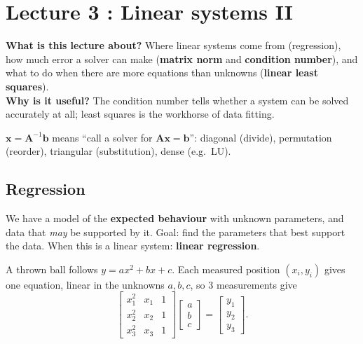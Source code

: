 \documentclass[11pt,a4paper,openany]{book}
\begin{document}
\chapter{Lecture 3 : Linear systems II}

\begin{rembox}[title=In a nutshell]
\textbf{What is this lecture about?} Where linear systems come from (regression), how much error
a solver can make (\textbf{matrix norm} and \textbf{condition number}), and what to do when there
are more equations than unknowns (\textbf{linear least squares}). \\
\textbf{Why is it useful?} The condition number tells whether a system can be solved accurately
at all; least squares is the workhorse of data fitting.
\end{rembox}

\begin{rembox}[title=Which solver?]
$\mathbf{x} = \mathbf{A}^{-1}\mathbf{b}$ means ``call a solver for $\mathbf{A}\mathbf{x} =
\mathbf{b}$'': diagonal (divide), permutation (reorder), triangular (substitution), dense
(e.g.\ LU).
\end{rembox}

\section{Regression}

\begin{defnbox}[title=Regression]
We have a model of the \textbf{expected behaviour} with unknown parameters, and data that
\emph{may} be supported by it. Goal: find the parameters that best support the data. When this
is a linear system: \textbf{linear regression}.
\end{defnbox}

\begin{exbox}[title=Ideal ballistic motion]
A thrown ball follows $y = ax^2 + bx + c$. Each measured position $(x_i, y_i)$ gives one equation,
linear in the unknowns $a, b, c$, so 3 measurements give
\[
\begin{bmatrix} x_1^2 & x_1 & 1 \\ x_2^2 & x_2 & 1 \\ x_3^2 & x_3 & 1 \end{bmatrix}
\begin{bmatrix} a \\ b \\ c \end{bmatrix} = \begin{bmatrix} y_1 \\ y_2 \\ y_3 \end{bmatrix}.
\]
\end{exbox}
\end{document}
